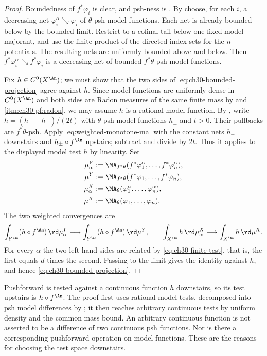 \begin{proof}
Boundedness of $f^*\varphi_i$ is clear, and psh-ness is
.  By
 choose, for each $i$, a
decreasing net $\varphi_i^\alpha\searrow\varphi_i$ of $\theta$-psh model
functions.  Each net is already bounded below by the bounded limit.
Restrict to a cofinal tail below one fixed model majorant, and use the
finite product of the directed index sets for the $n$ potentials.
The resulting nets are uniformly bounded above and below.  Then
$f^*\varphi_i^\alpha\searrow f^*\varphi_i$ is a decreasing net of bounded
$f^*\theta$-psh model functions.

Fix $h\in C^0(X^{\An})$; we must show that the two sides of
\eqref{eq:ch30-bounded-projection} agree against $h$.  Since model
functions are uniformly dense in $C^0(X^{\An})$ and both sides are Radon
measures of the same finite mass by
 and
\,\cref{itm:ch30-pf:radon}, we may assume
$h$ is a rational model function.  By ,
write $h=(h_+-h_-)/(2t)$ with $\theta$-psh model functions $h_\pm$
and $t>0$.  Their pullbacks are $f^*\theta$-psh.
Apply \eqref{eq:weighted-monotone-ma} with the constant nets $h_\pm$
downstairs and $h_\pm\circ f^{\An}$ upstairs; subtract and divide by
$2t$.  Thus it applies to the displayed model test $h$ by linearity.  Set
\[
 \begin{aligned}
 \mu_\alpha^Y
   &:=\MA_{f^*\theta}(f^*\varphi_1^\alpha,\ldots,
      f^*\varphi_n^\alpha),\\
 \mu^Y
   &:=\MA_{f^*\theta}(f^*\varphi_1,\ldots,f^*\varphi_n),\\
 \mu_\alpha^X
   &:=\MA_\theta(\varphi_1^\alpha,\ldots,\varphi_n^\alpha),\\
 \mu^X
   &:=\MA_\theta(\varphi_1,\ldots,\varphi_n).
 \end{aligned}
\]
The two weighted convergences are
\[
 \int_{Y^{\An}}(h\circ f^{\An})\,\rd\mu_\alpha^Y
 \longrightarrow
 \int_{Y^{\An}}(h\circ f^{\An})\,\rd\mu^Y,
 \qquad
 \int_{X^{\An}}h\,\rd\mu_\alpha^X
 \longrightarrow
 \int_{X^{\An}}h\,\rd\mu^X.
\]
For every $\alpha$ the two left-hand sides are related by
\eqref{eq:ch30-finite-test}, that is, the first equals $d$ times the
second.  Passing to the limit gives the identity against $h$, and hence
\eqref{eq:ch30-bounded-projection}.
\end{proof}

\begin{remark}
\label{rem:ch30-test-function}
Pushforward is tested against a continuous function $h$ downstairs,
so its test upstairs is $h\circ f^{\An}$.  The proof first uses rational
model tests, decomposed into psh model differences by
; it then reaches arbitrary continuous
tests by uniform density and the common mass bound.
An arbitrary continuous function is not asserted to be a difference of
two continuous psh functions.  Nor is there a corresponding pushforward
operation on model functions.  These are the reasons for choosing the
test space downstairs.
\end{remark}

